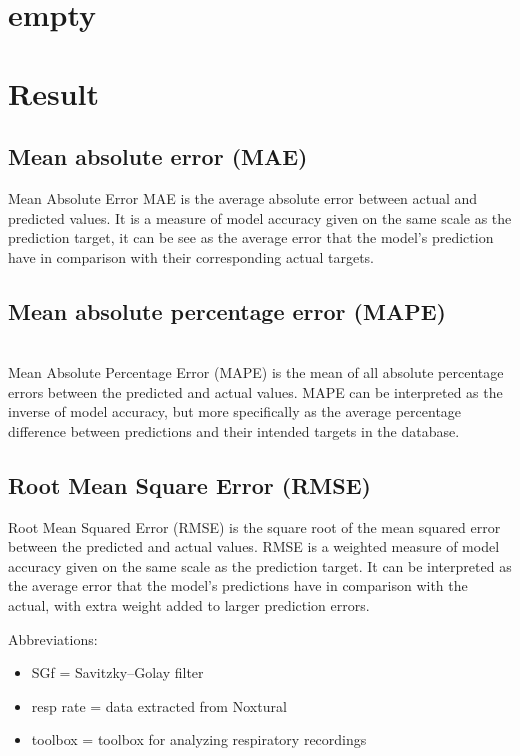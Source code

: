 \chapter{empty}
\chapter*{Result}

\section{Mean absolute error (MAE)}
Mean Absolute Error MAE is the average absolute error between actual and predicted values.  It is a measure of model accuracy given on the same scale as the prediction target, it can be see as the average error that the model's prediction have in comparison with their corresponding actual targets.


\section {Mean absolute percentage error (MAPE)} \\
Mean Absolute Percentage Error (MAPE) is the mean of all absolute percentage errors between the predicted and actual values.
MAPE can be interpreted as the inverse of model accuracy, but more specifically as the average percentage difference between predictions and their intended targets in the database.


 \section{Root Mean Square Error (RMSE) }
 Root Mean Squared Error (RMSE) is the square root of the mean squared error between the predicted and actual values.
 RMSE is a weighted measure of model accuracy given on the same scale as the prediction target. It can be interpreted as the average error that the model’s predictions have in comparison with the actual, with extra weight added to larger prediction errors.
 
 Abbreviations:
\begin{itemize}
    \item SGf = Savitzky–Golay filter
    \item resp rate = data extracted from Noxtural
    \item toolbox = toolbox for analyzing respiratory recordings
         \cite{noto2018automated}
\end{itemize}

